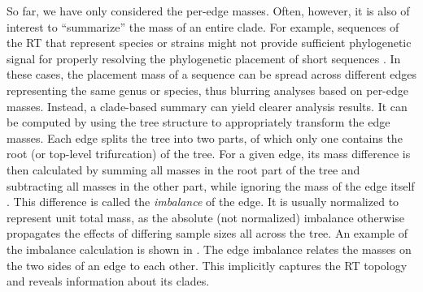 So far, we have only considered the per-edge masses.
Often, however, it is also of interest to ``summarize'' the mass of an entire clade. %
For example, sequences of the \ac{RT} that represent species or strains might not provide sufficient phylogenetic signal
for properly resolving the phylogenetic placement of short sequences \cite{Dunthorn2014}.
In these cases, the placement mass of a sequence can be spread across different edges representing the same genus or species,
thus blurring analyses based on per-edge masses.
Instead, a clade-based summary can yield clearer analysis results.
It can be computed by using the tree structure to appropriately transform the edge masses.
Each edge splits the tree into two parts, of which only one contains the root (or top-level trifurcation) of the tree.
For a given edge, its mass difference is then calculated by summing all masses in the root part of the tree
and subtracting all masses in the other part,
while ignoring the mass of the edge itself \cite{Matsen2011a}.
This difference is called the \emph{imbalance} of the edge.
It is usually normalized to represent unit total mass,
as the absolute (not normalized) imbalance otherwise propagates the effects of differing sample sizes all across the tree.
An example of the imbalance calculation is shown in .
The edge imbalance relates the masses on the two sides of an edge to each other.
This implicitly captures the \ac{RT} topology and reveals information about its clades.
